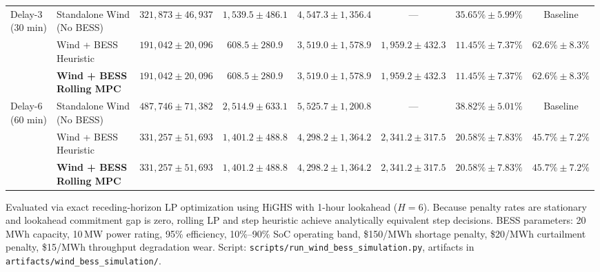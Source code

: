 \documentclass[
  journal]{IEEEtran}
\begin{document}
\begin{table}[!t]
\begin{tabular*}{\textwidth}{@{\extracolsep{\fill}}llcccccc@{}}
\midrule
\shortstack[l]{Delay-3\\(30 min)} & \shortstack[l]{Standalone Wind\\(No BESS)} & $321,873 \pm 46,937$ & $1,539.5 \pm 486.1$ & $4,547.3 \pm 1,356.4$ & --- & $35.65\% \pm 5.99\%$ & Baseline \\
 & \shortstack[l]{Wind + BESS\\Heuristic} & $191,042 \pm 20,096$ & $608.5 \pm 280.9$ & $3,519.0 \pm 1,578.9$ & $1,959.2 \pm 432.3$ & $11.45\% \pm 7.37\%$ & $62.6\% \pm 8.3\%$ \\
 & \shortstack[l]{\textbf{Wind + BESS}\\\textbf{Rolling MPC}} & $191,042 \pm 20,096$ & $608.5 \pm 280.9$ & $3,519.0 \pm 1,578.9$ & $1,959.2 \pm 432.3$ & $11.45\% \pm 7.37\%$ & $62.6\% \pm 8.3\%$ \\
\midrule
\shortstack[l]{Delay-6\\(60 min)} & \shortstack[l]{Standalone Wind\\(No BESS)} & $487,746 \pm 71,382$ & $2,514.9 \pm 633.1$ & $5,525.7 \pm 1,200.8$ & --- & $38.82\% \pm 5.01\%$ & Baseline \\
 & \shortstack[l]{Wind + BESS\\Heuristic} & $331,257 \pm 51,693$ & $1,401.2 \pm 488.8$ & $4,298.2 \pm 1,364.2$ & $2,341.2 \pm 317.5$ & $20.58\% \pm 7.83\%$ & $45.7\% \pm 7.2\%$ \\
 & \shortstack[l]{\textbf{Wind + BESS}\\\textbf{Rolling MPC}} & $331,257 \pm 51,693$ & $1,401.2 \pm 488.8$ & $4,298.2 \pm 1,364.2$ & $2,341.2 \pm 317.5$ & $20.58\% \pm 7.83\%$ & $45.7\% \pm 7.2\%$ \\
\bottomrule
\end{tabular*}
\vspace{1mm}
\raggedright\fontsize{8.0pt}{9.0pt}\selectfont Evaluated via exact receding-horizon LP optimization using HiGHS with 1-hour lookahead ($H=6$). Because penalty rates are stationary and lookahead commitment gap is zero, rolling LP and step heuristic achieve analytically equivalent step decisions. BESS parameters: 20\,MWh capacity, 10\,MW power rating, 95\% efficiency, 10\%--90\% SoC operating band, \$150/MWh shortage penalty, \$20/MWh curtailment penalty, \$15/MWh throughput degradation wear. Script: \texttt{scripts/run\_wind\_bess\_simulation.py}, artifacts in \texttt{artifacts/wind\_bess\_simulation/}.
\end{table}
\end{document}
